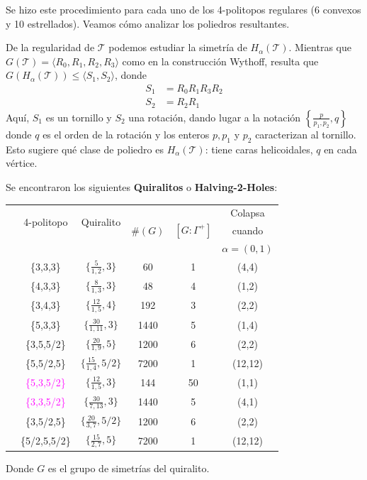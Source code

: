 \documentclass[spanish]{article}
\theoremstyle{definition}
\newcommand{\T}{\mathcal{T}}
\begin{document}
Se hizo este procedimiento para cada uno de los 4-politopos regulares (6 convexos y 10 estrellados). Veamos cómo analizar los poliedros resultantes.

De la regularidad de $\mathcal{T}$ podemos estudiar la simetría de $H_\alpha(\mathcal{T})$. Mientras que $G(\mathcal{T})=\langle R_0,R_1,R_2,R_3\rangle$ como en la construcción Wythoff, resulta que $G(H_\alpha(\mathcal{T}))\leq \langle S_1,S_2\rangle$, donde
\begin{align*}
	S_1&=R_0R_1R_3R_2\\
	S_2&=R_2R_1
\end{align*}
Aquí, $S_1$ es un tornillo y $S_2$ una rotación, dando lugar a la notación $\left\{\frac{p}{p_1,p_2},q\right\}$ donde $q$ es el orden de la rotación y los enteros $p,p_1$ y $p_2$ caracterizan al tornillo. Esto sugiere qué clase de poliedro es $H_\alpha(\mathcal{T})$: tiene caras helicoidales, $q$ en cada vértice.

Se encontraron los siguientes \textbf{Quiralitos} o \textbf{Halving-2-Holes}:

\begin{center}
	\begin{tabular}{|c|c|c|c|c|c|}
		\hline
		&\multirow{2}{*}{4-politopo} &\multirow{2}{*}{Quiralito}&  \multirow{3}{*}{$\#(G)$} &\multirow{3}{*}{$[G:\Gamma^+]$}& Colapsa\\
		&\multirow{2}{*}{ $\T$}&\multirow{2}{*}{$H_\alpha(T)$}&&&cuando\\
		&&&&&$\alpha=(0,1)$ \\
		\hline\hline
		\multirow{5}{*}{\rotatebox{90}{Convexos}}&\{3,3,3\} & $\{\frac{5}{1,2},3\}$ &60& 1 & (4,4) \\
		&\{4,3,3\} & $\{\frac{8}{1,3},3\}$ &48& 4&(1,2) \\
		&\{3,4,3\} & $\{\frac{12}{1,5},4\}$ &192&3&(2,2) \\
		&\{5,3,3\} & $\{\frac{30}{1,11},3\}$ &1440&5&(1,4)\\
		\hline
		\multirow{6}{*}{\rotatebox{90}{Estrellados}}&\{3,5,5/2\} &$\{\frac{20}{1,9},5\}$&1200&6&(2,2)\\
		&\{5,5/2,5\} & $\{\frac{15}{1,4},5/2\}$ &7200&1&(12,12)\\\cline{2-6}
		&\textcolor{magenta}{\{5,3,5/2\}} & $\{\frac{12}{1,5},3\}$ &144&50&(1,1)\\\cline{2-6}
		&\textcolor{magenta}{\{3,3,5/2\}}&$\{\frac{30}{7,13},3\}$& 1440 & 5 &(4,1)\\\cline{2-6}
		&\{3,5/2,5\}& $\{\frac{20}{3,7},5/2\}$ &1200&6& (2,2) \\
		&\{5/2,5,5/2\} & $\{\frac{15}{2,7},5\}$ &7200&1& (12,12)\\
		\hline
	\end{tabular}
\end{center}
Donde $G$ es el grupo de simetrías del quiralito.
\end{document}
